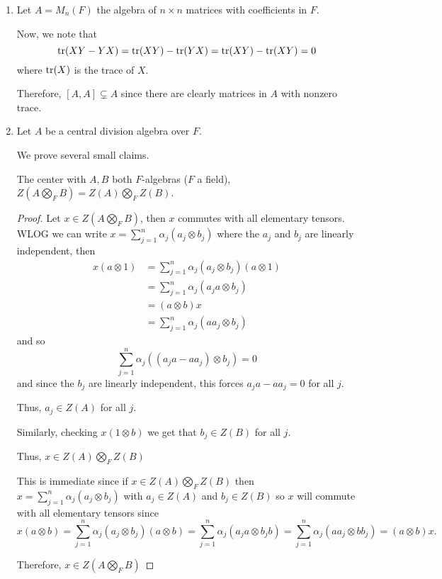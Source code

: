 \documentclass[12pt]{Qual}
\begin{document}
\begin{solution}$\,$
\begin{enumerate}[label=(\alph*)]
    \item Let $A=M_n(F)$ the algebra of $n\times n$ matrices with coefficients in $F$.

    Now, we note that $$\text{tr}(XY-YX)=\text{tr}(XY)-\text{tr}(YX)=\text{tr}(XY)-\text{tr}(XY)=0$$ where $\text{tr}(X)$ is the trace of $X.$

    Therefore, $[A,A]\subsetneq A$ since there are clearly matrices in $A$ with nonzero trace.
    \item Let $A$ be a central division algebra over $F$.

    We prove several small claims.

    \begin{claim} The center with $A,B$ both $F$-algebras ($F$ a field), $Z(A\bigotimes_F B)=Z(A)\bigotimes_F Z(B)$.
    \begin{proof} \boxed{\subset} Let $x\in Z(A\bigotimes_F B)$, then $x$ commutes with all elementary tensors. WLOG we can write $x=\sum_{j=1}^n\alpha_j(a_j\otimes b_j)$ where the $a_j$ and $b_j$ are linearly independent, then \begin{align*}
        x(a\otimes 1)&=\sum_{j=1}^n\alpha_j(a_j\otimes b_j)(a\otimes 1)\\
        &=\sum_{j=1}^n\alpha_j(a_ja\otimes b_j)\\
        &=(a\otimes b)x\\
        &=\sum_{j=1}^n\alpha_j(aa_j\otimes b_j)
    \end{align*} and so $$\sum_{j=1}^n\alpha_j((a_ja-aa_j)\otimes b_j)=0$$ and since the $b_j$ are linearly independent, this forces $a_ja-aa_j=0$ for all $j$.

    Thus, $a_j\in Z(A)$ for all $j.$

    Similarly, checking $x(1\otimes b)$ we get that $b_j\in Z(B)$ for all $j.$

    Thus, $x\in Z(A)\bigotimes_F Z(B)$

    \boxed{\supset} This is immediate since if $x\in Z(A)\bigotimes_F Z(B)$ then $x=\sum_{j=1}^n\alpha_j(a_j\otimes b_j)$ with $a_j\in Z(A)$ and $b_j\in Z(B)$ so $x$ will commute with all elementary tensors since $$x(a\otimes b)=\sum_{j=1}^n\alpha_j(a_j\otimes b_j)(a\otimes b)=\sum_{j=1}^n\alpha_j(a_ja\otimes b_jb)=\sum_{j=1}^n\alpha_j(aa_j\otimes bb_j)=(a\otimes b)x.$$

    Therefore, $x\in Z(A\bigotimes_F B)$
    \end{proof}
    \end{claim}


\end{enumerate}
\end{solution}
\end{document}

